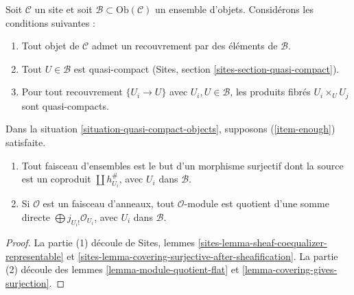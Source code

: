 \begin{situation}

\label{situation-quasi-compact-objects}
Soit $\mathcal{C}$ un site et soit
$\mathcal{B} \subset \text{Ob}(\mathcal{C})$ un ensemble d'objets.
Considérons les conditions suivantes :
\begin{enumerate}
\item
\label{item-enough}
Tout objet de $\mathcal{C}$ admet un recouvrement par des éléments de
$\mathcal{B}$. \item
\label{item-enough-qc}
Tout $U \in \mathcal{B}$ est quasi-compact (Sites, section
\ref{sites-section-quasi-compact}). \item
\label{item-enough-qc-qs}
Pour tout recouvrement $\{U_i \to U\}$ avec
$U_i, U \in \mathcal{B}$, les produits fibrés
$U_i \times_U U_j$ sont quasi-compacts.
\end{enumerate}

\end{situation}

\begin{lemma}

\label{lemma-module-quotient-direct-sum}
Dans la situation \ref{situation-quasi-compact-objects}, supposons
(\ref{item-enough}) satisfaite.
\begin{enumerate}
\item Tout faisceau d'ensembles est le but d'un morphisme surjectif dont la
source est un coproduit $\coprod h_{U_i}^\#$, avec $U_i$ dans
$\mathcal{B}$.
\item Si $\mathcal{O}$ est un faisceau d'anneaux, tout
$\mathcal{O}$-module est quotient d'une somme directe
$\bigoplus\nolimits j_{U_i!}\mathcal{O}_{U_i}$, avec $U_i$ dans
$\mathcal{B}$.
\end{enumerate}

\end{lemma}

\begin{proof}

La partie (1) découle de Sites, lemmes
\ref{sites-lemma-sheaf-coequalizer-representable} et
\ref{sites-lemma-covering-surjective-after-sheafification}. La partie (2)
découle des lemmes \ref{lemma-module-quotient-flat} et
\ref{lemma-covering-gives-surjection}.

\end{proof}

